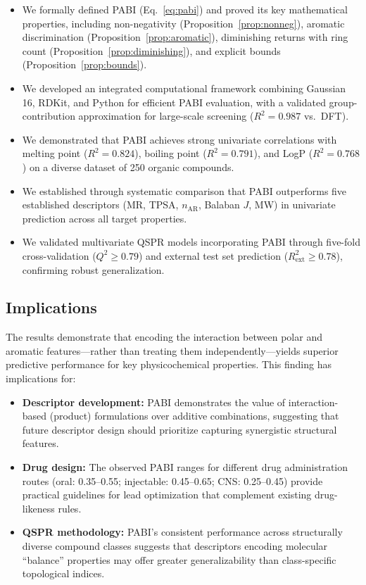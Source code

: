 \documentclass[12pt,a4paper]{article}
\begin{document}
\begin{itemize}[leftmargin=2em]
\item We formally defined PABI (Eq.~\ref{eq:pabi}) and proved its key mathematical properties, including non-negativity (Proposition~\ref{prop:nonneg}), aromatic discrimination (Proposition~\ref{prop:aromatic}), diminishing returns with ring count (Proposition~\ref{prop:diminishing}), and explicit bounds (Proposition~\ref{prop:bounds}).
\item We developed an integrated computational framework combining Gaussian 16, RDKit, and Python for efficient PABI evaluation, with a validated group-contribution approximation for large-scale screening ($R^2 = 0.987$ vs.\ DFT).
\item We demonstrated that PABI achieves strong univariate correlations with melting point ($R^2 = 0.824$), boiling point ($R^2 = 0.791$), and LogP ($R^2 = 0.768$) on a diverse dataset of 250 organic compounds.
\item We established through systematic comparison that PABI outperforms five established descriptors (MR, TPSA, $n_{\text{AR}}$, Balaban $J$, MW) in univariate prediction across all target properties.
\item We validated multivariate QSPR models incorporating PABI through five-fold cross-validation ($Q^2 \geq 0.79$) and external test set prediction ($R^2_{\text{ext}} \geq 0.78$), confirming robust generalization.
\end{itemize}

\subsection{Implications}

The results demonstrate that encoding the interaction between polar and aromatic features---rather than treating them independently---yields superior predictive performance for key physicochemical properties. This finding has implications for:

\begin{itemize}[leftmargin=2em]
\item \textbf{Descriptor development:} PABI demonstrates the value of interaction-based (product) formulations over additive combinations, suggesting that future descriptor design should prioritize capturing synergistic structural features.
\item \textbf{Drug design:} The observed PABI ranges for different drug administration routes (oral: 0.35--0.55; injectable: 0.45--0.65; CNS: 0.25--0.45) provide practical guidelines for lead optimization that complement existing drug-likeness rules.
\item \textbf{QSPR methodology:} PABI's consistent performance across structurally diverse compound classes suggests that descriptors encoding molecular ``balance'' properties may offer greater generalizability than class-specific topological indices.
\end{itemize}
\end{document}
